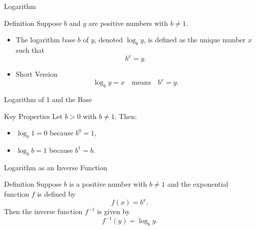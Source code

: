   \begin{frame}{Logarithm}
    \begin{block}{Definition}
      Suppose \(b\) and \(y\) are positive numbers with \(b\neq 1\). 
      \begin{itemize}
        \item The logarithm base \(b\) of \(y\), denoted \(\log_b y\), is defined as the unique number \(x\) such that
        \[
          b^x = y.
        \]
        \item  Short Version
        \[
          \log_b y = x \quad \text{means} \quad b^x = y.
        \]
      \end{itemize}
    \end{block}
  \end{frame}

  \begin{frame}{Logarithm of 1 and the Base}
    \begin{block}{Key Properties}
      Let \(b>0\) with \(b\neq 1\). Then:
      \begin{itemize}
        \item \(\log_b 1 = 0\) because \(b^0 = 1\),
        \item \(\log_b b = 1\) because \(b^1 = b\).
      \end{itemize}
    \end{block}
  \end{frame}

  \begin{frame}{Logarithm as an Inverse Function}
    \begin{block}{Definition}
      Suppose \(b\) is a positive number with \(b \neq 1\) and the exponential function \(f\) is defined by
      \[
        f(x) = b^x.
      \]
      Then the inverse function \(f^{-1}\) is given by
      \[
        f^{-1}(y) = \log_b y.
      \]
    \end{block}
  \end{frame}
  
